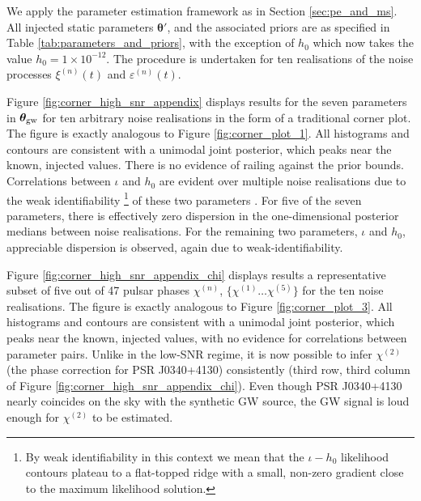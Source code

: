 \documentclass[fleqn,usenatbib,useAMS]{mnras}
\begin{document}
We apply the parameter estimation framework as in Section \ref{sec:pe_and_ms}. All injected static parameters $\boldsymbol{\theta}'$, and the associated priors are as specified in Table \ref{tab:parameters_and_priors}, with the exception of $h_0$ which now takes the value $h_0 = 1 \times 10^{-12}$. The procedure is undertaken for ten realisations of the noise processes $\xi^{(n)}(t)$ and $\varepsilon^{(n)}(t)$. \newline 


Figure \ref{fig:corner_high_snr_appendix} displays results for the seven parameters in $\boldsymbol{\theta}_{\rm gw}$ for ten arbitrary noise realisations in the form of a traditional corner plot. The figure is exactly analogous to Figure \ref{fig:corner_plot_1}. All histograms and contours are consistent with a unimodal joint posterior, which peaks near the known, injected values. There is no evidence of railing against the prior bounds. Correlations between $\iota$ and $h_0$ are evident over multiple noise realisations due to the weak identifiability \footnote{By weak identifiability in this context we mean that the $\iota-h_0$ likelihood contours plateau to a flat-topped ridge with a small, non-zero gradient close to the maximum likelihood solution.} of these two parameters \citep{e5be7c83a0d24500826f6e1b414d1733}. For five of the seven parameters, there is effectively zero dispersion in the one-dimensional posterior medians between noise realisations. For the remaining two parameters, $\iota$ and $h_0$, appreciable dispersion is observed, again due to weak-identifiability. \newline 


Figure \ref{fig:corner_high_snr_appendix_chi} displays results a representative subset of five out of 47 pulsar phases $\chi^{(n)}$, $ \{\chi^{(1)} \dots \chi^{(5)} \}$ for the ten noise realisations. The figure is exactly analogous to Figure \ref{fig:corner_plot_3}. All histograms and contours are consistent with a unimodal joint posterior, which peaks near the known, injected values, with no evidence for correlations between parameter pairs. Unlike in the low-SNR regime, it is now possible to infer $\chi^{(2)}$ (the phase correction for PSR J0340+4130) consistently (third row, third column of Figure \ref{fig:corner_high_snr_appendix_chi}). Even though PSR J0340+4130 nearly coincides on the sky with the synthetic GW source, the GW signal is loud enough for $\chi^{(2)}$ to be estimated.
\end{document}

